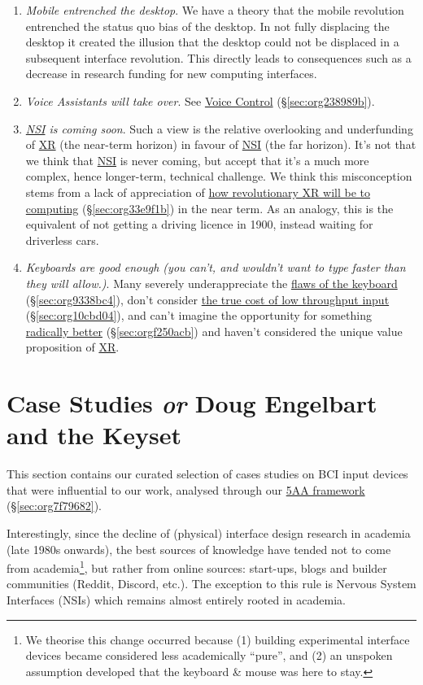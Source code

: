 \documentclass[logo,bsc,singlespacing,parskip]{infthesis}
\begin{document}
\begin{enumerate}
\item \emph{Mobile entrenched the desktop}.
We have a theory that the mobile revolution entrenched the status quo bias of the desktop.
In not fully displacing the desktop it created the illusion that the desktop could not be displaced in a subsequent interface revolution.
This directly leads to consequences such as a decrease in research funding for new computing interfaces.

\item \emph{Voice Assistants will take over}.
See \hyperref[sec:org238989b]{Voice Control} (\S \ref{sec:org238989b}).

\item \emph{\hyperref[orgf403bf3]{NSI} is coming soon}.
Such a view is the relative overlooking and underfunding of \hyperref[org39cbd51]{XR} (the near-term horizon) in favour of \hyperref[orgf403bf3]{NSI} (the far horizon).
It's not that we think that \hyperref[orgf403bf3]{NSI} is never coming, but accept that it's a much more complex, hence longer-term, technical challenge.
We think this misconception stems from a lack of appreciation of \hyperref[sec:org33e9f1b]{how revolutionary XR will be to computing} (\S \ref{sec:org33e9f1b}) in the near term.
As an analogy, this is the equivalent of not getting a driving licence in 1900, instead waiting for driverless cars.

\item \emph{Keyboards are good enough (you can't, and wouldn't want to type faster than they will allow.)}.
Many severely underappreciate the \hyperref[sec:org9338bc4]{flaws of the keyboard} (\S \ref{sec:org9338bc4}), don't consider \hyperref[sec:org10cbd04]{the true cost of low throughput input} (\S \ref{sec:org10cbd04}), and can't imagine the opportunity for something \hyperref[sec:orgf250acb]{radically better} (\S \ref{sec:orgf250acb}) and haven't considered the unique value proposition of \hyperref[org39cbd51]{XR}.
\end{enumerate}

\part{Case Studies \emph{or} Doug Engelbart and the Keyset}
\label{sec:orgb1f4c1e}
This section contains our curated selection of cases studies on BCI input devices that were influential to our work, analysed through our \hyperref[sec:org7f79682]{5AA framework} (\S \ref{sec:org7f79682}).

Interestingly, since the decline of (physical) interface design research in academia (late 1980s onwards), the best sources of knowledge have tended not to come from academia\footnote{We theorise this change occurred because (1) building experimental interface devices became considered less academically ``pure'', and (2) an unspoken assumption developed that the keyboard \& mouse was here to stay.}, but rather from online sources: start-ups, blogs and builder communities (Reddit, Discord, etc.).
The exception to this rule is Nervous System Interfaces (NSIs) which remains almost entirely rooted in academia.
\end{document}
